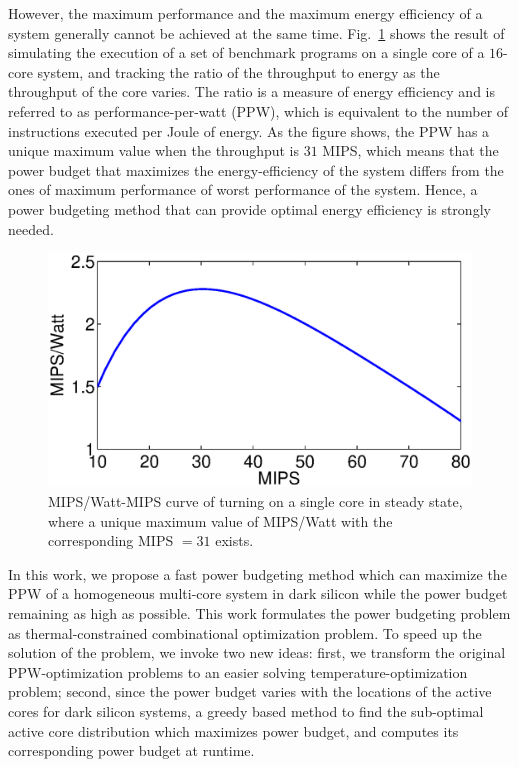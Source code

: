 
However, the maximum performance and the maximum energy efficiency of a system generally cannot be achieved at the same time. Fig.~\ref{fig:ppw_mips} shows the result of simulating the execution of a set of benchmark programs on a single core of a $16$-core system, and tracking the ratio of the throughput to energy as the throughput of the core varies. The ratio is a measure of energy efficiency and is referred to as performance-per-watt (PPW), which is equivalent to the number of instructions executed per Joule of energy. As the figure shows, the PPW has a unique maximum value when the throughput is $31$ MIPS, which means that the power budget that maximizes the energy-efficiency of the system differs from the ones of maximum performance of worst performance of the system. Hence, a power budgeting method that can provide optimal energy efficiency is strongly needed.



\begin{figure}
\centering
\includegraphics[width=0.8\linewidth]{fig/ppw_mips.eps}
\caption{MIPS/Watt-MIPS curve of turning on a single core in steady state, where a unique maximum value of MIPS/Watt with the corresponding MIPS $=31$ exists.}
\label{fig:ppw_mips}
\end{figure}

In this work, we propose a fast power budgeting method which can maximize the PPW of a homogeneous multi-core system in dark silicon while the power budget remaining as high as possible. This work formulates the power budgeting problem as thermal-constrained combinational optimization problem. To speed up the solution of the problem, we invoke two new ideas: first, we transform the original PPW-optimization problems to an easier solving temperature-optimization problem; second, since the power budget varies with the locations of the active cores for dark silicon systems, a greedy based method to find the sub-optimal active core distribution which maximizes power budget, and computes its corresponding power budget at runtime.

